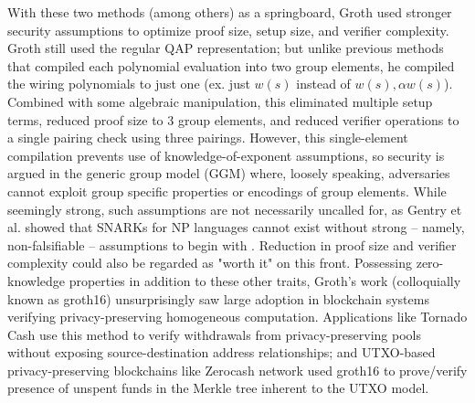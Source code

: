 \noindent With these two methods (among others) as a springboard, Groth \cite{groth16} used stronger security assumptions to optimize proof size, setup size, and verifier complexity. Groth still used the regular QAP representation; but unlike previous methods that compiled each polynomial evaluation into two group elements, he compiled the wiring polynomials to just one (ex. just $w(s)$ instead of $w(s), \alpha w(s)$). Combined with some algebraic manipulation, this eliminated multiple setup terms, reduced proof size to 3 group elements, and reduced verifier operations to a single pairing check using three pairings. However, this single-element compilation prevents use of knowledge-of-exponent assumptions, so security is argued in the generic group model (GGM) \cite{ggmlower} where, loosely speaking, adversaries cannot exploit group specific properties or encodings of group elements. While seemingly strong, such assumptions are not necessarily uncalled for, as Gentry et al. showed that SNARKs for NP languages cannot exist without strong -- namely, non-falsifiable -- assumptions to begin with \cite{nonfalsifiable}. Reduction in proof size and verifier complexity could also be regarded as "worth it" on this front. Possessing zero-knowledge properties in addition to these other traits, Groth's work (colloquially known as groth16) unsurprisingly saw large adoption in blockchain systems verifying privacy-preserving homogeneous computation. Applications like Tornado Cash \cite{tornadocash} use this method to verify withdrawals from privacy-preserving pools without exposing source-destination address relationships; and UTXO-based privacy-preserving blockchains like Zerocash network \cite{zcash} used groth16 to prove/verify presence of unspent funds in the Merkle tree inherent to the UTXO model. 


